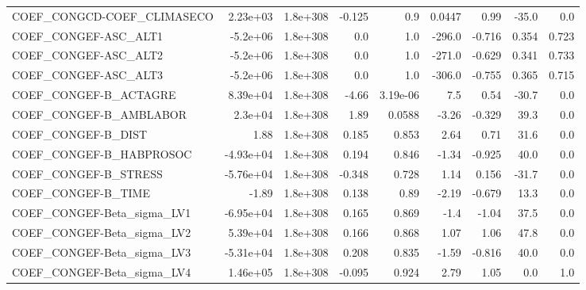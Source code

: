 \begin{tabular}{lrrrrrrrr}
COEF\_CONGCD-COEF\_CLIMASECO        &    2.23e+03 &     1.8e+308 &   -0.125 &      0.9 &     0.0447 &        0.99 &        -35.0 &           0.0 \\
COEF\_CONGEF-ASC\_ALT1              &    -5.2e+06 &     1.8e+308 &      0.0 &      1.0 &     -296.0 &      -0.716 &        0.354 &         0.723 \\
COEF\_CONGEF-ASC\_ALT2              &    -5.2e+06 &     1.8e+308 &      0.0 &      1.0 &     -271.0 &      -0.629 &        0.341 &         0.733 \\
COEF\_CONGEF-ASC\_ALT3              &    -5.2e+06 &     1.8e+308 &      0.0 &      1.0 &     -306.0 &      -0.755 &        0.365 &         0.715 \\
COEF\_CONGEF-B\_ACTAGRE             &    8.39e+04 &     1.8e+308 &    -4.66 & 3.19e-06 &        7.5 &        0.54 &        -30.7 &           0.0 \\
COEF\_CONGEF-B\_AMBLABOR            &     2.3e+04 &     1.8e+308 &     1.89 &   0.0588 &      -3.26 &      -0.329 &         39.3 &           0.0 \\
COEF\_CONGEF-B\_DIST                &        1.88 &     1.8e+308 &    0.185 &    0.853 &       2.64 &        0.71 &         31.6 &           0.0 \\
COEF\_CONGEF-B\_HABPROSOC           &   -4.93e+04 &     1.8e+308 &    0.194 &    0.846 &      -1.34 &      -0.925 &         40.0 &           0.0 \\
COEF\_CONGEF-B\_STRESS              &   -5.76e+04 &     1.8e+308 &   -0.348 &    0.728 &       1.14 &       0.156 &        -31.7 &           0.0 \\
COEF\_CONGEF-B\_TIME                &       -1.89 &     1.8e+308 &    0.138 &     0.89 &      -2.19 &      -0.679 &         13.3 &           0.0 \\
COEF\_CONGEF-Beta\_sigma\_LV1        &   -6.95e+04 &     1.8e+308 &    0.165 &    0.869 &       -1.4 &       -1.04 &         37.5 &           0.0 \\
COEF\_CONGEF-Beta\_sigma\_LV2        &    5.39e+04 &     1.8e+308 &    0.166 &    0.868 &       1.07 &        1.06 &         47.8 &           0.0 \\
COEF\_CONGEF-Beta\_sigma\_LV3        &   -5.31e+04 &     1.8e+308 &    0.208 &    0.835 &      -1.59 &      -0.816 &         40.0 &           0.0 \\
COEF\_CONGEF-Beta\_sigma\_LV4        &    1.46e+05 &     1.8e+308 &   -0.095 &    0.924 &       2.79 &        1.05 &          0.0 &           1.0 \\

\end{tabular}
